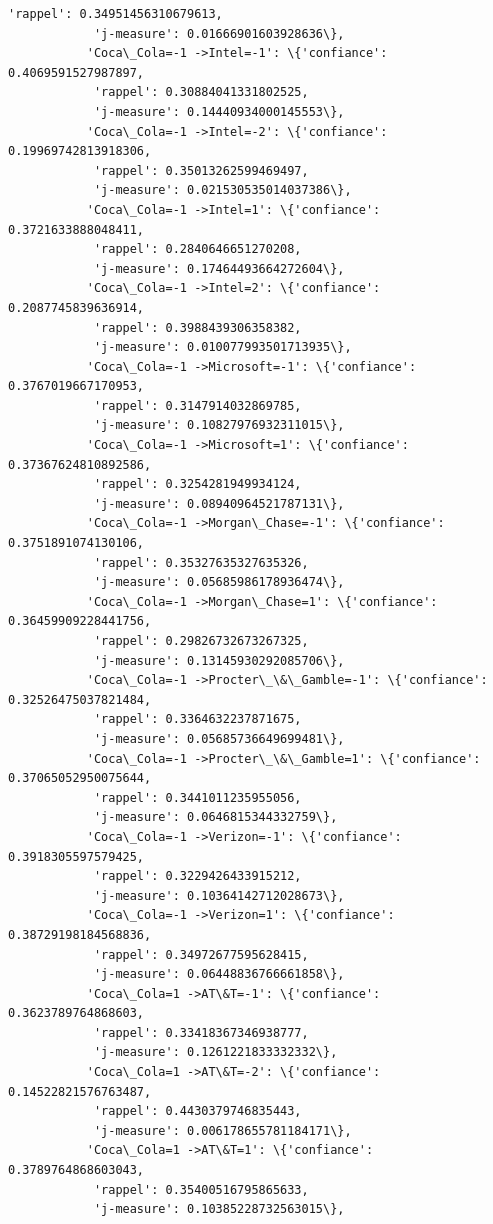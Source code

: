 \documentclass[11pt]{article}
\begin{document}
\begin{Verbatim}[commandchars=\\\{\}]
            'rappel': 0.34951456310679613,
            'j-measure': 0.01666901603928636\},
           'Coca\_Cola=-1 ->Intel=-1': \{'confiance': 0.4069591527987897,
            'rappel': 0.30884041331802525,
            'j-measure': 0.14440934000145553\},
           'Coca\_Cola=-1 ->Intel=-2': \{'confiance': 0.19969742813918306,
            'rappel': 0.35013262599469497,
            'j-measure': 0.021530535014037386\},
           'Coca\_Cola=-1 ->Intel=1': \{'confiance': 0.3721633888048411,
            'rappel': 0.2840646651270208,
            'j-measure': 0.17464493664272604\},
           'Coca\_Cola=-1 ->Intel=2': \{'confiance': 0.2087745839636914,
            'rappel': 0.3988439306358382,
            'j-measure': 0.010077993501713935\},
           'Coca\_Cola=-1 ->Microsoft=-1': \{'confiance': 0.3767019667170953,
            'rappel': 0.3147914032869785,
            'j-measure': 0.10827976932311015\},
           'Coca\_Cola=-1 ->Microsoft=1': \{'confiance': 0.37367624810892586,
            'rappel': 0.3254281949934124,
            'j-measure': 0.08940964521787131\},
           'Coca\_Cola=-1 ->Morgan\_Chase=-1': \{'confiance': 0.3751891074130106,
            'rappel': 0.35327635327635326,
            'j-measure': 0.05685986178936474\},
           'Coca\_Cola=-1 ->Morgan\_Chase=1': \{'confiance': 0.36459909228441756,
            'rappel': 0.29826732673267325,
            'j-measure': 0.13145930292085706\},
           'Coca\_Cola=-1 ->Procter\_\&\_Gamble=-1': \{'confiance': 0.32526475037821484,
            'rappel': 0.3364632237871675,
            'j-measure': 0.05685736649699481\},
           'Coca\_Cola=-1 ->Procter\_\&\_Gamble=1': \{'confiance': 0.37065052950075644,
            'rappel': 0.3441011235955056,
            'j-measure': 0.0646815344332759\},
           'Coca\_Cola=-1 ->Verizon=-1': \{'confiance': 0.3918305597579425,
            'rappel': 0.3229426433915212,
            'j-measure': 0.10364142712028673\},
           'Coca\_Cola=-1 ->Verizon=1': \{'confiance': 0.38729198184568836,
            'rappel': 0.34972677595628415,
            'j-measure': 0.06448836766661858\},
           'Coca\_Cola=1 ->AT\&T=-1': \{'confiance': 0.3623789764868603,
            'rappel': 0.33418367346938777,
            'j-measure': 0.1261221833332332\},
           'Coca\_Cola=1 ->AT\&T=-2': \{'confiance': 0.14522821576763487,
            'rappel': 0.4430379746835443,
            'j-measure': 0.006178655781184171\},
           'Coca\_Cola=1 ->AT\&T=1': \{'confiance': 0.3789764868603043,
            'rappel': 0.35400516795865633,
            'j-measure': 0.10385228732563015\},

\end{Verbatim}
\end{document}
